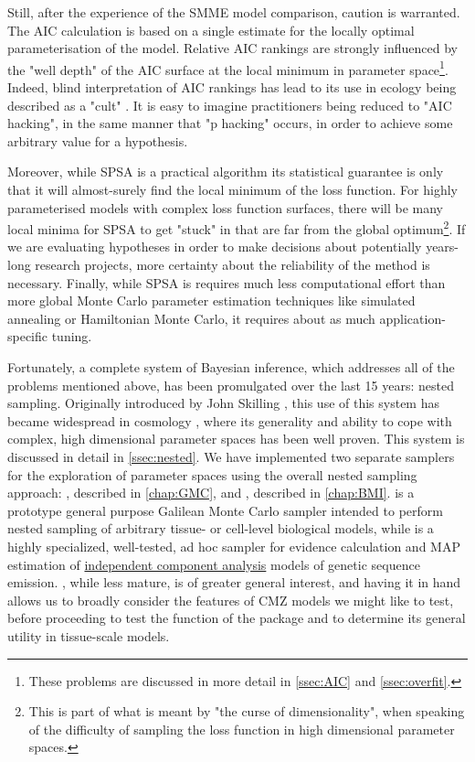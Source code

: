 \documentclass{ut-thesis}
\begin{document}
\begin{NoHyper}
Still, after the experience of the SMME model comparison, caution is warranted. The AIC calculation is based on a single estimate for the locally optimal parameterisation of the model. Relative AIC rankings are strongly influenced by the "well depth" of the AIC surface at the local minimum in parameter space\footnote{These problems are discussed in more detail in \autoref{ssec:AIC} and \autoref{ssec:overfit}.}. Indeed, blind interpretation of AIC rankings has lead to its use in ecology being described as a "cult" \cite{Brewer2020}. It is easy to imagine practitioners being reduced to "AIC hacking", in the same manner that "p hacking" occurs, in order to achieve some arbitrary value for a hypothesis.

Moreover, while SPSA is a practical algorithm its statistical guarantee is only that it will almost-surely find the local minimum of the loss function. For highly parameterised models with complex loss function surfaces, there will be many local minima for SPSA to get "stuck" in that are far from the global optimum\footnote{This is part of what is meant by "the curse of dimensionality", when speaking of the difficulty of sampling the loss function in high dimensional parameter spaces.}. If we are evaluating hypotheses in order to make decisions about potentially years-long research projects, more certainty about the reliability of the method is necessary. Finally, while SPSA is requires much less computational effort than more global Monte Carlo parameter estimation techniques like simulated annealing or Hamiltonian Monte Carlo, it requires about as much application-specific tuning.

Fortunately, a complete system of Bayesian inference, which addresses all of the problems mentioned above, has been promulgated over the last 15 years: nested sampling. Originally introduced by John Skilling \cite{Skilling2006}, this use of this system has became widespread in cosmology \cite{Trotta2008,Feroz2009,Higson2019}, where its generality and ability to cope with complex, high dimensional parameter spaces has been well proven. This system is discussed in detail in \autoref{ssec:nested}. We have implemented two separate samplers for the exploration of parameter spaces using the overall nested sampling approach: , described in \autoref{chap:GMC}, and , described in \autoref{chap:BMI}.  is a prototype general purpose Galilean Monte Carlo sampler intended to perform nested sampling of arbitrary tissue- or cell-level biological models, while  is a highly specialized, well-tested, ad hoc sampler for evidence calculation and MAP estimation of \hyperref[ssec:ICA]{independent component analysis} models of genetic sequence emission. , while less mature, is of greater general interest, and having it in hand allows us to broadly consider the features of CMZ models we might like to test, before proceeding to test the function of the package and to determine its general utility in tissue-scale models.


\end{NoHyper}
\end{document}
